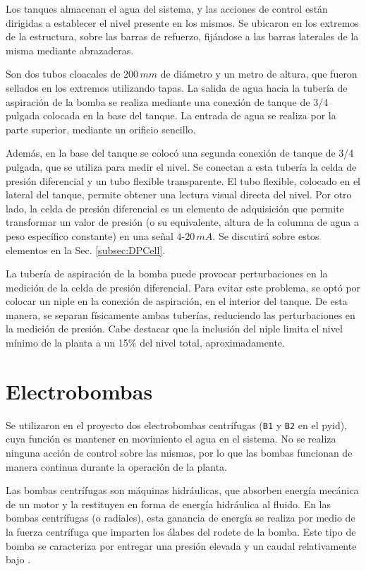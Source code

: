 Los tanques almacenan el agua del sistema, y las acciones de
control están dirigidas a establecer el nivel presente en los mismos.
Se ubicaron en los extremos de la estructura, sobre las barras de 
refuerzo, fijándose a las barras laterales de la misma mediante
abrazaderas.

Son dos tubos cloacales de $200\,mm$ de diámetro y un metro de altura, que
fueron sellados en los extremos utilizando tapas.
La salida de agua hacia la tubería de aspiración de la bomba se realiza
mediante una conexión de tanque de 3/4 pulgada colocada en la base del tanque.
La entrada de agua se realiza por la parte superior, mediante un orificio
sencillo.

Además, en la base del tanque se colocó una segunda conexión de tanque de 3/4
pulgada, que se utiliza para medir el nivel.
Se conectan a esta tubería la celda de presión diferencial y un tubo
flexible transparente.
El tubo flexible, colocado en el lateral del tanque, permite obtener una
lectura visual directa del nivel.
Por otro lado, la celda de presión diferencial es un elemento de adquisición
que permite transformar un valor de presión (o su equivalente, altura de la
columna de agua a peso específico constante) en
una señal $4$-$20\,mA$.
Se discutirá sobre estos elementos en la Sec. \ref{subsec:DPCell}.

La tubería de aspiración de la bomba puede provocar
perturbaciones en la medición de la celda de presión diferencial.
Para evitar este problema, se optó por
colocar un niple en la conexión de aspiración, en el interior del tanque.
De esta manera, se separan físicamente ambas tuberías, reduciendo las
perturbaciones en la medición de presión.
Cabe destacar que la inclusión del niple limita el nivel mínimo de la planta a
un 15\% del nivel total, aproximadamente.

\section{Electrobombas}
\label{sec:Bombas}

Se utilizaron en el proyecto dos electrobombas centrífugas (\verb|B1| y
\verb|B2| en el \gls{pyid}), cuya función es
mantener en movimiento el agua en el sistema.
No se realiza ninguna acción de control sobre las
mismas, por lo que las bombas funcionan de manera continua durante la operación
de la planta.

Las bombas centrífugas son máquinas hidráulicas, que absorben energía mecánica
de un motor y la restituyen en forma de energía hidráulica al fluido.
En las bombas centrífugas (o radiales), esta ganancia de energía se realiza por
medio de la fuerza centrífuga que imparten los álabes del rodete de la bomba.
Este tipo de bomba se caracteriza por entregar una presión elevada y un caudal
relativamente bajo \cite{bib:Mataix}.

